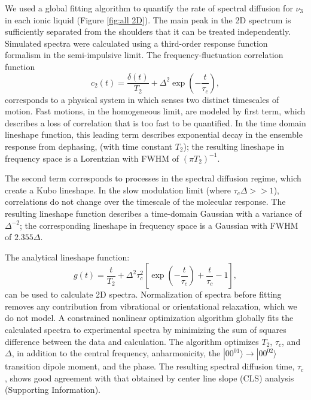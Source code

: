 We used a global fitting algorithm to quantify the rate of spectral diffusion for $\nu_3$ in each ionic liquid (Figure \ref{fig:all 2D}). The main peak in the 2D spectrum is sufficiently separated from the shoulders that it can be treated independently. Simulated spectra were calculated using a third-order response function formalism in the semi-impulsive limit. The frequency-fluctuation correlation function
\begin{equation} 
	\label{eq:c2}
	c_{2}(t) = \frac{\delta(t)}{T_2} + \Delta^2 \exp \left( -\frac{t}{\tau_c} \right),
\end{equation}
\noindent corresponds to a physical system in which  senses two distinct timescales of motion. Fast motions, in the homogeneous limit, are modeled by first term, which describes a loss of correlation that is too fast to be quantified. In the time domain lineshape function, this leading term describes exponential decay in the ensemble response from dephasing, (with time constant $T_2$); the resulting lineshape in frequency space is a Lorentzian with FWHM of $\left( \pi T_{2} \right)^{-1}$.

The second term corresponds to processes in the spectral diffusion regime, which create a Kubo lineshape. In the slow modulation limit (where $\tau_c \Delta >> 1$), correlations do not change over the timescale of the molecular response. The resulting lineshape function describes a time-domain Gaussian with a variance of $\Delta^{-2}$; the corresponding lineshape in frequency space is a Gaussian with FWHM of $2.355\Delta$.

The analytical lineshape function:
\begin{equation}
\label{eq:g(t)}
	g(t) = \frac{t}{T_2} + \Delta^2\tau_c^2 \left[ \exp{\left( -\frac{t}{\tau_c} \right)}
	+ \frac{t}{\tau_c} - 1 \right],
\end{equation}
\noindent can be used to calculate 2D spectra. Normalization of spectra before fitting removes any contribution from vibrational or orientational relaxation, which we do not model. A constrained nonlinear optimization algorithm globally fits the calculated spectra to experimental spectra by minimizing the sum of squares difference between the data and calculation. The algorithm optimizes $T_2$, $\tau_c$, and $\Delta$, in addition to the central frequency, anharmonicity, the $|00^01{\rangle} \rightarrow |00^02{\rangle}$ transition dipole moment, and the phase. The resulting spectral diffusion time, $\tau_c$, shows good agreement with that obtained by center line slope (CLS) analysis (Supporting Information).


